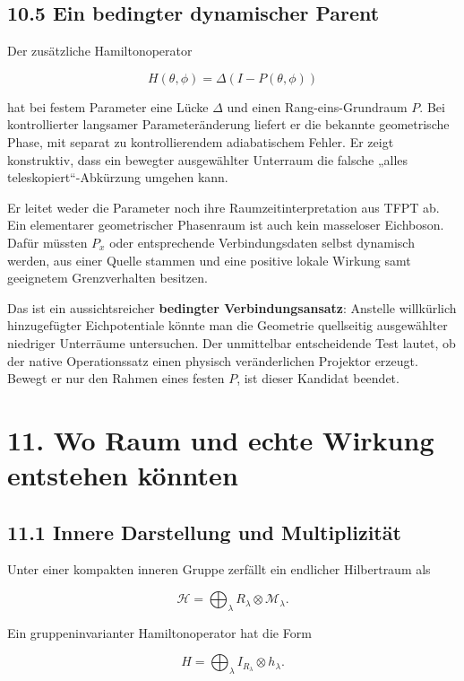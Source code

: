 \subsection{10.5 Ein bedingter dynamischer
Parent}\label{ein-bedingter-dynamischer-parent}

Der zusätzliche Hamiltonoperator

\[H(\theta,\phi)=\Delta(I-P(\theta,\phi))\]

hat bei festem Parameter eine Lücke \(\Delta\) und einen
Rang-eins-Grundraum \(P\). Bei kontrollierter langsamer
Parameteränderung liefert er die bekannte geometrische Phase, mit
separat zu kontrollierendem adiabatischem Fehler. Er zeigt konstruktiv,
dass ein bewegter ausgewählter Unterraum die falsche „alles
teleskopiert``-Abkürzung umgehen kann.

Er leitet weder die Parameter noch ihre Raumzeitinterpretation aus TFPT
ab. Ein elementarer geometrischer Phasenraum ist auch kein masseloser
Eichboson. Dafür müssten \(P_x\) oder entsprechende Verbindungsdaten
selbst dynamisch werden, aus einer Quelle stammen und eine positive
lokale Wirkung samt geeignetem Grenzverhalten besitzen.

Das ist ein aussichtsreicher \textbf{bedingter Verbindungsansatz}:
Anstelle willkürlich hinzugefügter Eichpotentiale könnte man die
Geometrie quellseitig ausgewählter niedriger Unterräume untersuchen. Der
unmittelbar entscheidende Test lautet, ob der native Operationssatz
einen physisch veränderlichen Projektor erzeugt. Bewegt er nur den
Rahmen eines festen \(P\), ist dieser Kandidat beendet.

\section{11. Wo Raum und echte Wirkung entstehen
könnten}\label{wo-raum-und-echte-wirkung-entstehen-kuxf6nnten}

\subsection{11.1 Innere Darstellung und
Multiplizität}\label{innere-darstellung-und-multiplizituxe4t}

Unter einer kompakten inneren Gruppe zerfällt ein endlicher Hilbertraum
als

\[\mathcal H=\bigoplus_\lambda R_\lambda\otimes\mathcal M_\lambda.\]

Ein gruppeninvarianter Hamiltonoperator hat die Form

\[H=\bigoplus_\lambda I_{R_\lambda}\otimes h_\lambda.\]

